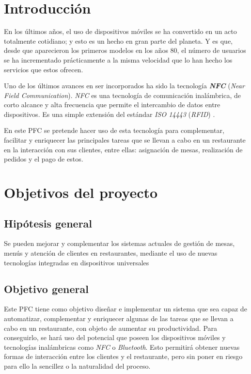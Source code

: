 \section{Introducción}
En los últimos años, el uso de dispositivos móviles se ha convertido
en un acto totalmente cotidiano; y esto es un hecho en gran parte del planeta.
Y es que, desde que aparecieron los primeros modelos en los años 80, el número
de usuarios se ha incrementado prácticamente a la misma velocidad que lo han
hecho los servicios que estos ofrecen.

Uno de los últimos avances en ser incorporados ha sido la tecnología
\emph{\textbf{NFC}} (\emph{Near Field Communication}). \emph{NFC} es una
tecnología de comunicación inalámbrica, de corto alcance y alta frecuencia que
permite el intercambio de datos entre dispositivos. Es una simple extensión
del estándar \emph{ISO 14443} (\emph{RFID}) \cite{bib:RFID}.

En este PFC se pretende hacer uso de esta tecnología para complementar,
facilitar y enriquecer las principales tareas que se llevan a cabo en un
restaurante en la interacción con sus clientes, entre ellas: asignación de
mesas, realización de pedidos y el pago de estos.

\section{Objetivos del proyecto}
\subsection{Hipótesis general}
Se pueden mejorar y complementar los sistemas actuales de gestión de mesas, 
menús y atención de clientes en restaurantes, mediante el uso de nuevas 
tecnologías integradas en dispositivos universales

\subsection{Objetivo general}
Este PFC tiene como objetivo diseñar e implementar un sistema que sea capaz de
automatizar, complementar y enriquecer algunas de las tareas que se llevan a 
cabo en un restaurante, con objeto de aumentar su productividad. Para
conseguirlo, se hará uso del potencial que poseen los dispositivos móviles y
tecnologías inalámbricas como \emph{NFC} o \emph{Bluetooth}. Esto permitirá
obtener nuevas formas de interacción entre los clientes y el restaurante, pero
sin poner en riesgo para ello la sencillez o la naturalidad del proceso.


